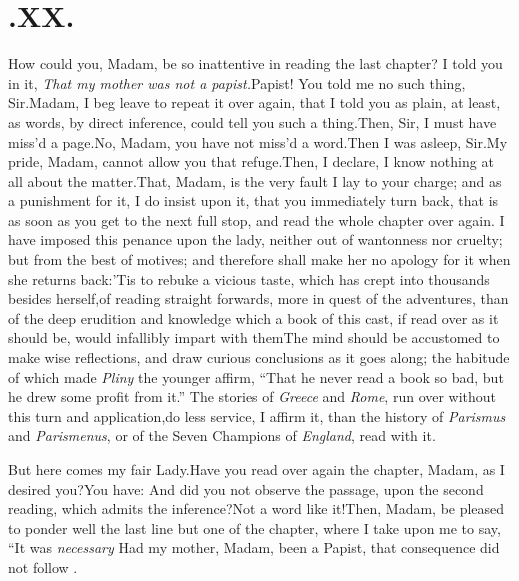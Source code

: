 \documentclass{article}
\begin{document}
\vskip 48pt
\newpage
\section{.\enspace XX.}

\quad\tsh How could you, Madam, be
so
inattentive in reading the last chapter? I told you in it, \textit{That my mother was not a
papist.}\tsh  Papist! You told me no such thing,
Sir.\tsk  Madam, I beg leave to repeat it over again, that I told
you as plain, at least, as words, by direct inference, could tell
you such a thing.\tsk  Then, Sir, I must have miss’d a
page.\tsk  No, Madam, you have not miss’d a word.\tsk  Then
I was asleep, Sir.\tsk  My pride, Madam, cannot allow you that
refuge.\tsk  Then, I declare, I know nothing at all about the
matter.\tsk  That, Madam, is the very fault I lay to your charge;
and as a punishment for it, I do insist upon it, that you
immediately turn back, that is as soon as you get to the next full
stop, and read the whole chapter over again. I have imposed this
penance upon the lady, neither out of wantonness nor cruelty; but
from the best of motives; and therefore shall make her no apology
for it when she returns back:\tsk  ’Tis to rebuke a vicious
taste, which has crept into thousands besides herself,\tsk  of
reading straight forwards, more in quest of the adventures, than of the deep erudition
and knowledge which a book of this cast, if read over as it should
be, would infallibly impart with them\tsh  The mind should
be accustomed to make wise reflections, and draw curious
conclusions as it goes along; the habitude of which made
\textit{Pliny} the younger affirm, “That he never read a
book so bad, but he drew some profit from it.” The stories of
\textit{Greece} and \textit{Rome}, run over without this turn and
application,\tsk  do less service, I affirm it, than the history
of \textit{Parismus} and \textit{Parismenus}, or of the Seven Champions
of \textit{England}, read with it.

\tsh  But here comes my fair Lady.\break Have you read over again the
chapter, Madam, as I desired you?\tsk  You have: And did you not observe the
passage, upon the second reading, which admits the inference?\tsk  Not a word
like it!\break Then, Madam, be pleased to ponder well the last line but one of the
chapter, where I take upon me to say, “It was \textit{necessary}
Had my mother, Madam, been a
Papist, that consequence did not follow \fnast.\\
\end{document}
